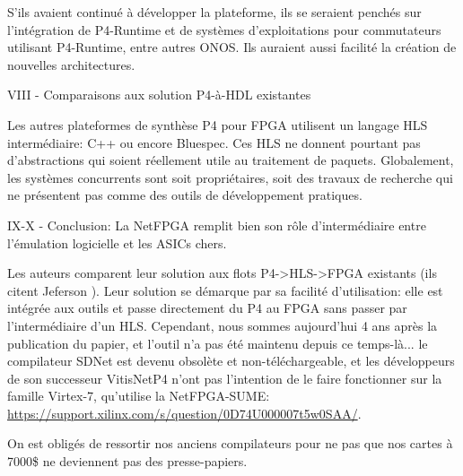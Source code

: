 S'ils avaient continué à développer la plateforme, ils se seraient penchés sur l'intégration de P4-Runtime et de systèmes d'exploitations pour commutateurs utilisant P4-Runtime, entre autres ONOS. Ils auraient aussi facilité la création de nouvelles architectures.

VIII - Comparaisons aux solution P4-à-HDL existantes

Les autres plateformes de synthèse P4 pour FPGA utilisent un langage HLS intermédiaire: C++ ou encore Bluespec. Ces HLS ne donnent pourtant pas d'abstractions qui soient réellement utile au traitement de paquets. Globalement, les systèmes concurrents sont soit propriétaires, soit des travaux de recherche qui ne présentent pas comme des outils de développement pratiques.

IX-X - Conclusion: La NetFPGA remplit bien son rôle d'intermédiaire entre l'émulation logicielle et les ASICs chers.

 Les auteurs comparent leur solution aux flots P4->HLS->FPGA existants (ils citent Jeferson \cite{santiago_da_silva_p4-compatible_2018}). Leur solution se démarque par sa facilité d'utilisation: elle est intégrée aux outils et passe directement du P4 au FPGA sans passer par l'intermédiaire d'un HLS.
Cependant, nous sommes aujourd'hui 4 ans après la publication du papier, et l'outil n'a pas été maintenu depuis ce temps-là... le compilateur SDNet est devenu obsolète et non-téléchargeable, et les développeurs de son successeur VitisNetP4 n'ont pas l'intention de le faire fonctionner sur la famille Virtex-7, qu'utilise la NetFPGA-SUME: \url{https://support.xilinx.com/s/question/0D74U000007t5w0SAA/}.

On est obligés de ressortir nos anciens compilateurs pour ne pas que nos cartes à 7000\$ ne deviennent pas des presse-papiers.

\clearpage
